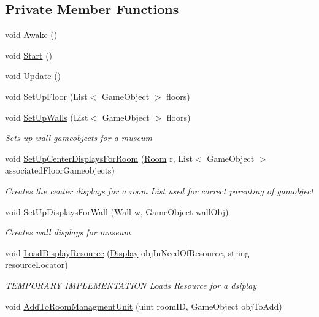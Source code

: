 \subsection*{Private Member Functions}
\begin{DoxyCompactItemize}
\item 
void \mbox{\hyperlink{class_museum_builder_a846546ea2e9bf91bba2a166dc2b01e2d}{Awake}} ()
\item 
void \mbox{\hyperlink{class_museum_builder_a33c69af71baa8a6033be9d2fc04ef5f8}{Start}} ()
\item 
void \mbox{\hyperlink{class_museum_builder_a6f66f859260dac43de5248e3c4a0b25c}{Update}} ()
\item 
void \mbox{\hyperlink{class_museum_builder_a7a68d64f1f418c4cdf43afc48ffa07b1}{Set\+Up\+Floor}} (List$<$ Game\+Object $>$ floors)
\item 
void \mbox{\hyperlink{class_museum_builder_a52350d2e48a73d0e5400e2d8d31a8913}{Set\+Up\+Walls}} (List$<$ Game\+Object $>$ floors)
\begin{DoxyCompactList}\small\item\em Sets up wall gameobjects for a museum \end{DoxyCompactList}\item 
void \mbox{\hyperlink{class_museum_builder_a159e037415aaf348d5a0af9561be8560}{Set\+Up\+Center\+Displays\+For\+Room}} (\mbox{\hyperlink{class_room}{Room}} r, List$<$ Game\+Object $>$ associated\+Floor\+Gameobjects)
\begin{DoxyCompactList}\small\item\em Creates the center displays for a room List used for correct parenting of gamobject \end{DoxyCompactList}\item 
void \mbox{\hyperlink{class_museum_builder_adbfb12c00a855fe0f816bc18a51a72e5}{Set\+Up\+Displays\+For\+Wall}} (\mbox{\hyperlink{class_wall}{Wall}} w, Game\+Object wall\+Obj)
\begin{DoxyCompactList}\small\item\em Creates wall displays for museum \end{DoxyCompactList}\item 
void \mbox{\hyperlink{class_museum_builder_a895b10deac965d8d7b936dd76d82484d}{Load\+Display\+Resource}} (\mbox{\hyperlink{class_display}{Display}} obj\+In\+Need\+Of\+Resource, string resource\+Locator)
\begin{DoxyCompactList}\small\item\em T\+E\+M\+P\+O\+R\+A\+RY I\+M\+P\+L\+E\+M\+E\+N\+T\+A\+T\+I\+ON Loads Resource for a dsiplay \end{DoxyCompactList}\item 
void \mbox{\hyperlink{class_museum_builder_ad1991ecd1258a2eb6d020d3c429ad9c8}{Add\+To\+Room\+Managment\+Unit}} (uint room\+ID, Game\+Object obj\+To\+Add)
\end{DoxyCompactItemize}
